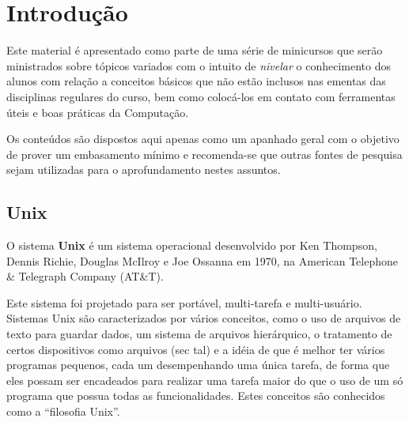 \documentclass{handout_utfpr}
\begin{document}
\maketitle
\section{Introdução}

Este material é apresentado como parte de uma série de minicursos que serão ministrados sobre tópicos variados com o intuito de \textit{nivelar} o conhecimento dos alunos com relação a conceitos básicos que não estão inclusos nas ementas das disciplinas regulares do curso, bem como colocá-los em contato com ferramentas úteis e boas práticas da Computação.

Os conteúdos são dispostos aqui apenas como um apanhado geral com o objetivo de prover um embasamento mínimo e recomenda-se que outras fontes de pesquisa sejam utilizadas para o aprofundamento nestes assuntos.

\subsection{Unix}
O sistema \textbf{Unix} é um sistema operacional desenvolvido por Ken Thompson, Dennis Richie, Douglas McIlroy e Joe Ossanna em 1970, na American Telephone \& Telegraph Company (AT\&T).

Este sistema foi projetado para ser portável, multi-tarefa e multi-usuário. Sistemas Unix são caracterizados por vários conceitos, como o uso de arquivos de texto para guardar dados, um sistema de arquivos hierárquico, o tratamento de certos dispositivos como arquivos (sec tal) e a idéia de que é melhor ter vários programas pequenos, cada um desempenhando uma única tarefa, de forma que eles possam ser encadeados para realizar uma tarefa maior do que o uso de um só programa que possua todas as funcionalidades. Estes conceitos são conhecidos como a ``filosofia Unix''.


\end{document}
